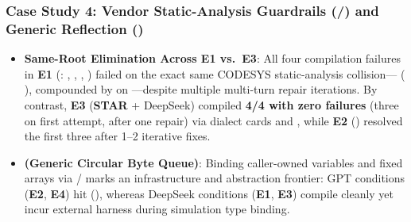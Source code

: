 \subsubsection{Case Study 4: Vendor Static-Analysis Guardrails (/) and Generic Reflection ()}
\begin{itemize}
  \item \textbf{Same-Root  Elimination Across \textbf{E1} vs.\ \textbf{E3}}: All four compilation failures in \textbf{E1} (: , , , ) failed on the exact same CODESYS static-analysis collision--- (  ), compounded by  on ---despite multiple multi-turn repair iterations. By contrast, \textbf{E3} (\textbf{STAR} + DeepSeek) compiled \textbf{4/4 with zero  failures} (three on first attempt,  after one repair) via dialect cards and , while \textbf{E2} () resolved the first three after 1--2 iterative fixes.
  \item \textbf{ (Generic Circular Byte Queue)}: Binding caller-owned  variables and fixed arrays via  /  marks an infrastructure and abstraction frontier: GPT conditions (\textbf{E2}, \textbf{E4}) hit  (), whereas DeepSeek conditions (\textbf{E1}, \textbf{E3}) compile cleanly yet incur external harness  during simulation type binding.
\end{itemize}